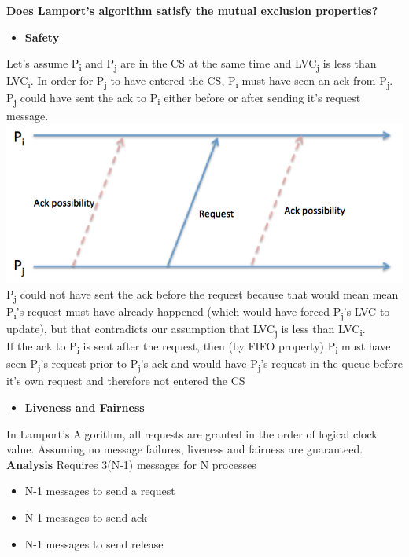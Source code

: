 \documentclass[twoside]{article}
\begin{document}
\textbf{Does Lamport's algorithm satisfy the mutual exclusion properties?}
\begin{itemize}
    \item \textbf{Safety}
\end{itemize}
Let's assume P\textsubscript{i} and P\textsubscript{j} are in the CS at the same time and LVC\textsubscript{j} is less than
LVC\textsubscript{i}. In order for P\textsubscript{j} to have entered the CS, P\textsubscript{i} must have seen an ack
from P\textsubscript{j}. P\textsubscript{j} could have sent the ack to  P\textsubscript{i} either before or after sending
it's request message. \\
\includegraphics{lamportSafety.png} \\
P\textsubscript{j} could not have sent the ack before the request because that would mean mean
P\textsubscript{i}'s request must have already happened (which would have forced P\textsubscript{j}'s LVC to update),
but that contradicts our assumption that LVC\textsubscript{j} is less than LVC\textsubscript{i}. \\
If the ack to P\textsubscript{i} is sent after the request, then (by FIFO property) P\textsubscript{i} must
have seen P\textsubscript{j}'s request prior to P\textsubscript{j}'s ack and would have P\textsubscript{j}'s request
in the queue before it's own request and therefore not entered the CS
\begin{itemize}
    \item \textbf{Liveness and Fairness}
\end{itemize}
In Lamport's Algorithm, all requests are granted in the order of logical clock value. Assuming no message failures,
liveness and fairness are guaranteed. \\

\textbf{Analysis}
Requires 3(N-1) messages for N processes
\begin{itemize}
    \item N-1 messages to send a request
    \item N-1 messages to send ack
    \item N-1 messages to send release
\end{itemize}
\end{document}
